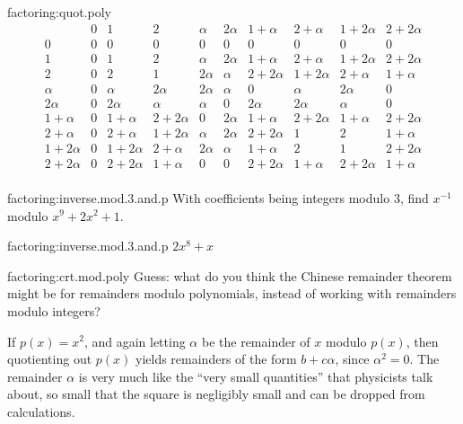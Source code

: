 \begin{answer}{factoring:quot.poly}
\[
\begin{array}{c|ccccccccc}
          &
0         &
1         &
2         & 
\alpha    &
2\alpha   &
1+\alpha  &
2+\alpha  &
1+2\alpha &
2+2\alpha \\
\hline
0         & 0 & 0 & 0 & 0 & 0 & 0 & 0 & 0 & 0 
\\
1         &
0         &
1         &
2         & 
\alpha    &
2\alpha   &
1+\alpha  &
2+\alpha  &
1+2\alpha &
2+2\alpha \\
2         &
0         &
2         &
1         & 
2\alpha    &
\alpha   &
2+2\alpha  &
1+2\alpha  &
2+\alpha &
1+\alpha 
\\
\alpha    &
0         &
\alpha    &
2\alpha   & 
2\alpha   &
 \alpha   &
0  &
\alpha  &
2\alpha &
0 \\
2\alpha   &
0         &
2\alpha   &
\alpha    & 
\alpha    &  
0         &
2\alpha   &
2\alpha   &
\alpha    &
0 \\
1+\alpha   &
0          &
1+\alpha   &
2+2\alpha  & 
0          &  
2\alpha    &
1+\alpha   &
2+2\alpha  &
1+\alpha   &
2+2\alpha \\
2+\alpha   &
0          &
2+\alpha   &
1+2\alpha  & 
\alpha          &  
2\alpha    &
2+2\alpha   &
1  &
2   &
1+\alpha \\
1+2\alpha   &
0          &
1+2\alpha   &
2+\alpha  & 
2\alpha         &  
\alpha  &
1+\alpha   &
2 &
1  &
2+2\alpha \\
2+2\alpha   &
0          &
2+2\alpha   &
1+\alpha  & 
0          &  
0    &
2+2\alpha   &
1+\alpha  &
2+2\alpha   &
1+\alpha   \\
\end{array}
\]
\end{answer}
\begin{problem}{factoring:inverse.mod.3.and.p}
With coefficients being integers modulo 3, find \(x^{-1}\) modulo \(x^9+2x^2+1\).
\end{problem}
\begin{answer}{factoring:inverse.mod.3.and.p}
\(2x^8+x\)
\end{answer}
\begin{problem}{factoring:crt.mod.poly}
Guess: what do you think the Chinese remainder theorem might be for remainders modulo polynomials, instead of working with remainders modulo integers?
\end{problem}
\begin{example}
If \(p(x)=x^2\), and again letting \(\alpha\) be the remainder of \(x\) modulo \(p(x)\), then quotienting out \(p(x)\) yields remainders of the form \(b + c \alpha\), since \(\alpha^2=0\).
The remainder \(\alpha\) is very much like the ``very small quantities'' that physicists talk about, so small that the square is negligibly small and can be dropped from calculations.
\end{example}
